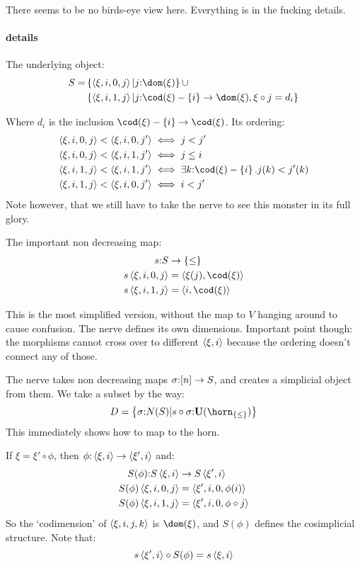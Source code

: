 \documentclass[csh.tex]{subfiles}
\begin{document}
There seems to be no birds-eye view here. Everything is in the fucking details.

\paragraph{details}
The underlying object:
\begin{align*} S = &\set{\tuplet{\xi,i,0,j}| j\of \dom(\xi)} \cup\\
&\set{\tuplet{\xi,i,1,j}| j\of \cod(\xi) - \set i\to\dom(\xi),\xi\circ j = d_i}\\
\end{align*}

Where $d_i$ is the inclusion $\cod(\xi) - \set i \to \cod(\xi)$.
Its ordering:
\begin{align*}
\tuplet{\xi,i,0,j} < \tuplet{\xi,i,0,j'}&\iff j< j'\\
\tuplet{\xi,i,0,j} < \tuplet{\xi,i,1,j'}&\iff j\leq i\\
\tuplet{\xi,i,1,j} < \tuplet{\xi,i,1,j'}&\iff \exists k\of \cod(\xi) - \set i. j(k) < j'(k) \\
\tuplet{\xi,i,1,j} < \tuplet{\xi,i,0,j'}&\iff i < j'
\end{align*}
Note however, that we still have to take the nerve to see this monster in its full glory.

The important non decreasing map:
\begin{align*}
s\of S &\to \set\leq\\
s\tuplet{\xi,i,0,j} &= \tuplet{\xi(j),\cod(\xi)}\\
s\tuplet{\xi,i,1,j} &= \tuplet{i,\cod(\xi)}\\
\end{align*}


This is the most simplified version, without the map to $V$ hanging around to cause confusion.
The nerve defines its own dimensions. Important point though: the morphisms cannot cross over to different $\left\langle \xi,i \right\rangle$ because the ordering doesn't connect any of those. 

The nerve takes non decreasing maps $\sigma\mathord :[n]\to S$, and creates a simplicial object from them. We take a subset by the way: 
\[ D = \set{ \sigma\of N(S)|s\circ \sigma \of \base(\horn_{\set\leq}) }\]
This immediately shows how to map to the horn. 

If $\xi = \xi' \circ \phi$, then $\phi\mathord :\left\langle \xi,i \right\rangle\to\left\langle \xi',i \right\rangle$ and: 
\begin{align*}
S(\phi)\mathord : S\left\langle \xi,i \right\rangle&\to S\left\langle \xi',i \right\rangle\\
S(\phi)\left\langle \xi,i,0,j \right\rangle &= \left\langle \xi',i,0,\phi(i) \right\rangle\\
S(\phi)\left\langle \xi,i,1,j \right\rangle &= \left\langle \xi',i,0,\phi\circ j \right\rangle
\end{align*}
So the `codimension' of $\left\langle \xi,i,j,k \right\rangle$ is $\dom(\xi)$, and $S(\phi)$ defines the cosimplicial structure. Note that:
\[ s\left\langle \xi',i \right\rangle\circ S(\phi) = s\left\langle \xi,i \right\rangle\]
\end{document}
